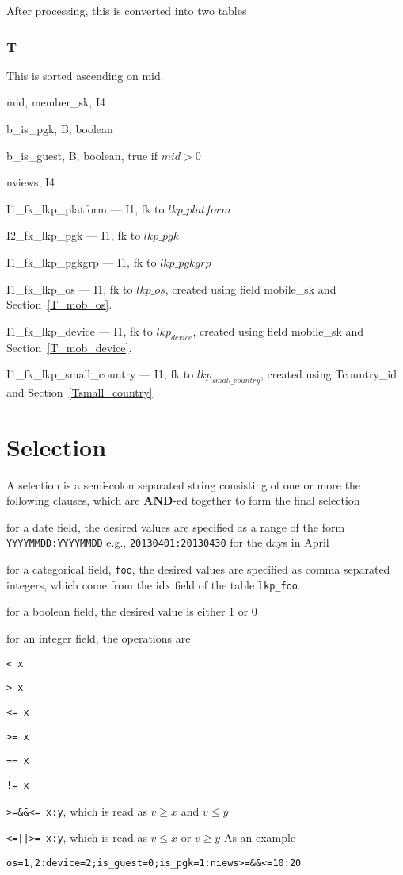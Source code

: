 After processing, this is converted into two tables

\subsubsection{T}
\label{T}

This is sorted ascending on mid
\be
\item mid, member\_sk, I4
\item b\_is\_pgk, B, boolean
\item b\_is\_guest, B, boolean, true if \(mid > 0\)
\item nviews, I4
\item I1\_fk\_lkp\_platform --- I1, fk to \(lkp\_{platform}\)
\item I2\_fk\_lkp\_pgk --- I1, fk to \(lkp\_{pgk}\)
\item I1\_fk\_lkp\_pgkgrp --- I1, fk to \(lkp\_{pgkgrp}\)

\item I1\_fk\_lkp\_os --- I1, fk to \(lkp\_{os}\), 
  created using field mobile\_sk and Section~\ref{T_mob_os}.
\item I1\_fk\_lkp\_device --- I1, fk to \(lkp_{device}\), 
  created using field mobile\_sk and Section~\ref{T_mob_device}.
\item I1\_fk\_lkp\_small\_country --- I1, fk to
\(lkp_{small\_country}\), created using Tcountry\_id and
Section~\ref{Tsmall_country}
\ee

\section{Selection}
A selection is a semi-colon separated string consisting of one or more
the following clauses, which are {\bf AND}-ed together to form the final
selection
\be
\item for a date field, the desired values are specified as a range of
the form \verb+YYYYMMDD:YYYYMMDD+ e.g., \verb+20130401:20130430+ for the
days in April
\item for a categorical field, {\tt foo}, the desired values are specified 
as comma separated integers, which come from the idx field of the table
{\tt lkp\_foo}.
\item for a boolean field, the desired value is either 1 or 0
\item for an integer field, the operations are 
\be
\item \verb+< x+
\item \verb+> x+
\item \verb+<= x+
\item \verb+>= x+
\item \verb+== x+
\item \verb+!= x+
\item \verb+>=&&<= x:y+, which is read as \(v \geq x\) and \( v \leq y\)
\item \verb+<=||>= x:y+, which is read as \(v \leq x\) or  \( v \geq y\)
\ee
\ee
As an example
\begin{verbatim}
os=1,2:device=2;is_guest=0;is_pgk=1:niews>=&&<=10:20
\end{verbatim}

